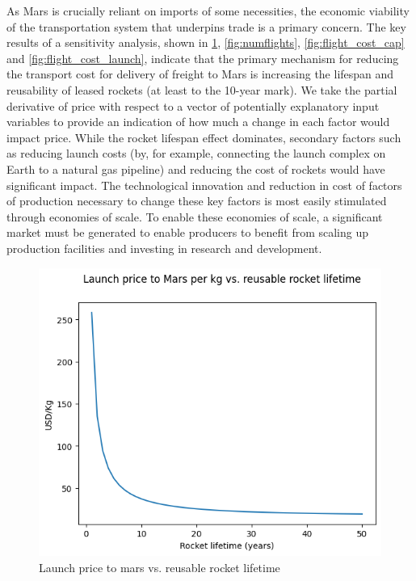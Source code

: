\documentclass[fleqn,10pt]{Stylesheet} %
\begin{document}
As Mars is crucially reliant on imports of some necessities, the economic viability of the transportation system that underpins trade is a primary concern. The key results of a sensitivity analysis, shown in \ref{fig:reuse}, \ref{fig:numflights}, \ref{fig:flight_cost_cap} and \ref{fig:flight_cost_launch}, indicate that the primary mechanism for reducing the transport cost for delivery of freight to Mars is increasing the lifespan and reusability of leased rockets (at least to the 10-year mark). We take the partial derivative of price with respect to a vector of potentially explanatory input variables to provide an indication of how much a change in each factor would impact price. While the rocket lifespan effect dominates, secondary factors such as reducing launch costs (by, for example, connecting the launch complex on Earth to a natural gas pipeline) and reducing the cost of rockets would have significant impact. The technological innovation and reduction in cost of factors of production necessary to change these key factors is most easily stimulated through economies of scale. To enable these economies of scale, a significant market must be generated to enable producers to benefit from scaling up production facilities and investing in research and development. 

\begin{figure}
    \centering
    \includegraphics[width=\linewidth]{fig_reuse.png}
    \caption{Launch price to mars vs. reusable rocket lifetime}
    \label{fig:reuse}
\end{figure}
\end{document}
